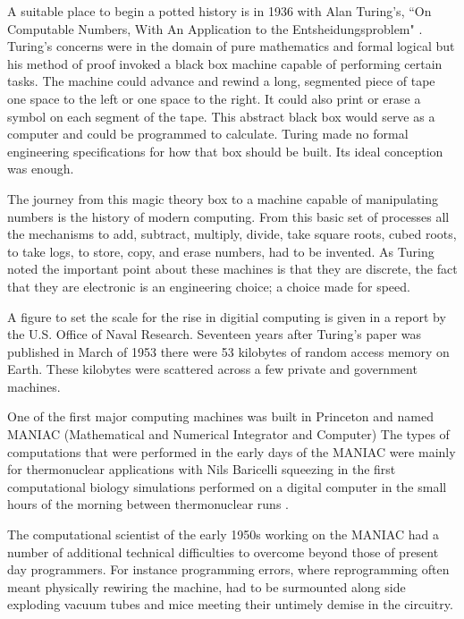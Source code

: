 A suitable place to begin a potted history is in 
1936 with Alan Turing's, ``On Computable Numbers, 
With An Application to the Entsheidungsproblem"
\cite{turing36a}. Turing's concerns were in the domain of pure mathematics and
formal logical but his method of proof invoked a black box machine capable of performing
certain tasks. The machine could advance and rewind a long,
segmented piece of tape one space to the left or one space to the right. 
It could also print or erase a symbol on each segment of the tape.
This abstract black box would serve as a computer and could be programmed 
to calculate. Turing made no formal engineering
specifications for how that box should be built. 
Its ideal conception was enough.

The journey from this magic theory box to a machine capable of manipulating
numbers is the history of modern computing. From this basic set of processes
all the mechanisms to add, subtract, multiply, divide, take square roots, cubed roots, to take logs,
to store, copy, and erase numbers, had to be invented. As Turing noted the important point about
these machines is that they are discrete, the fact that they are electronic
is an engineering choice; a choice made for speed.

A figure to set the scale for the rise in digitial computing is given in a report
by the U.S. Office of Naval Research. Seventeen years after Turing's paper 
was published in March of 1953 there were 53 kilobytes of 
random access memory on Earth.\cite{usonr53}
These kilobytes were scattered across a few private and government machines. 

One of the first major computing machines was built in Princeton and named
MANIAC (Mathematical and Numerical Integrator and Computer)
The types of computations that were performed in the early days of the MANIAC 
were mainly for thermonuclear applications with Nils Baricelli 
squeezing in the first computational biology simulations 
performed on a digital computer in the small hours of the morning
between thermonuclear runs \cite{dyson12, barricelli54, barricelli62}.

The computational scientist of the early 1950s working
on the MANIAC had a number of additional 
technical difficulties to overcome beyond those of present day programmers. 
For instance programming errors, where reprogramming often meant physically rewiring
the machine, had to be surmounted along side exploding
vacuum tubes and mice meeting their untimely demise in the circuitry.

